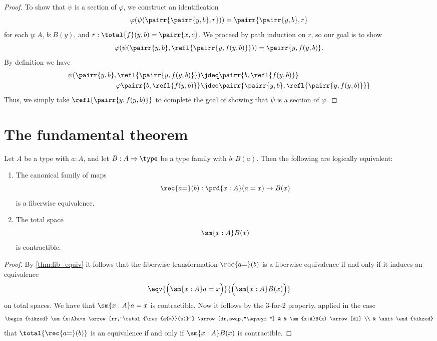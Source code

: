 \begin{proof}
To show that $\psi$ is a section of $\varphi$, we construct an identification 
\begin{equation*}
\varphi(\psi(\pairr{\pairr{y,b},r}))=\pairr{\pairr{y,b},r}
\end{equation*}
for each $y:A$, $b:B(y)$, and $r:\total{f}(y,b)=\pairr{x,c}$. 
We proceed by path induction on $r$, so our goal is to show
\begin{equation*}
\varphi(\psi(\pairr{y,b},\refl{\pairr{y,f(y,b)}}))=\pairr{y,f(y,b)}.
\end{equation*}
By definition we have
\begin{align*}
\psi(\pairr{y,b},\refl{\pairr{y,f(y,b)}})& \jdeq \pairr{b,\refl{f(y,b)}} \\
\varphi\pairr{b,\refl{f(y,b)}} & \jdeq \pairr{\pairr{y,b},\refl{\pairr{y,f(y,b)}}}
\end{align*}
Thus, we simply take $\refl{\pairr{y,f(y,b)}}$ to complete the goal of showing that $\psi$ is a section of $\varphi$.
\end{proof}

\section{The fundamental theorem}

\begin{thm}\label{thm:id_fundamental}
Let $A$ be a type with $a:A$, and let $B:A\to\type$ be a type family with $b:B(a)$.
Then  the following are logically equivalent:
\begin{enumerate}
\item The canonical family of maps
\begin{equation*}
\rec{a{=}}(b):\prd{x:A} (a=x)\to B(x)
\end{equation*}
is a fiberwise equivalence.
\item The total space
\begin{equation*}
\sm{x:A}B(x)
\end{equation*}
is contractible.
\end{enumerate}
\end{thm}

\begin{proof}
By \autoref{thm:fib_equiv} it follows that the fiberwise transformation $\rec{a{=}}(b)$ is a fiberwise equivalence if and only if it induces an equivalence
\begin{equation*}
\eqv{\Big(\sm{x:A}a=x\Big)}{\Big(\sm{x:A}B(x)\Big)}
\end{equation*}
on total spaces. We have that $\sm{x:A}a=x$ is contractible. Now it follows by the 3-for-2 property, applied in the case
\begin{equation*}
\begin{tikzcd}
\sm{x:A}a=x \arrow[rr,"\total{\rec{a{=}}(b)}"] \arrow[dr,swap,"\eqvsym"] & & \sm{x:A}B(x) \arrow[dl] \\
& \unit
\end{tikzcd}
\end{equation*}
that $\total{\rec{a{=}}(b)}$ is an equivalence if and only if $\sm{x:A}B(x)$ is contractible.
\end{proof}

